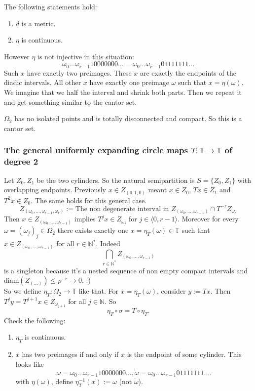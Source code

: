 \documentclass{article}
\newcommand*{\N}{\mathbb{N}}
\newcommand*{\T}{\mathbb{T}}
\newcommand*{\Ns}{\N^*}
\newcommand*{\jbr}[1]{{\langle #1 \rangle}}
\newcommand*{\diam}{\text{diam}}
\begin{document}
\begin{prop}
    The following statements hold:
    \begin{enumerate}
        \item $d$ is a metric.

        \item $\eta$ is continuous.
    \end{enumerate}
\end{prop}

However $\eta$ is not injective in this situation:
$$\omega_0\dots\omega_{r-1}10000000\dots = \omega_0\dots\omega_{r-1}01111111\dots$$
Such $x$ have exactly two preimages. These $x$ are exactly the endpoints of the diadic intervals. All other $x$ have exactly one preimage $\omega$ such that $x=\eta(\omega)$.
\newline
\newline
We imagine that we half the interval and shrink both parts. Then we repeat it and get something similar to the cantor set.

\begin{prop}
    $\Omega_2$ has no isolated points and is totally disconnected and compact. So this is a cantor set.
\end{prop}

\subsubsection{The general uniformly expanding circle maps $T:\T\to\T$ of degree 2}

Let $Z_0,Z_1$ be the two cylinders. So the natural semipartition is $S = \{Z_0,Z_1\}$ with overlapping endpoints. Previously $x\in Z_{(0,1,0)}$ meant $x \in Z_0$, $Tx\in Z_1$ and $T^2x\in Z_0$. The same holds for this general case.
$$Z_{(\omega_0,\dots,\omega_{r-1},\omega_r)} := \text{The non degenerate interval in } Z_{(\omega_0,\dots,\omega_{r-1})}\cap T^{-r}Z_{\omega_r}$$
Then $x\in Z_{(\omega_0,\dots,\omega_{r-1})}$ implies $T^jx\in Z_{\omega_j}$ for $j\in\jbr{0,r-1}$. Moreover for every $\omega=(\omega_j)_j\in\Omega_2$ there exists exactly one $x = \eta_T(\omega)\in\T$ such that $x \in Z_{(\omega_0,\dots,\omega_{r-1})}$ for all $r\in\Ns$. Indeed
$$\bigcap_{r\in\Ns} Z_{(\omega_0,\dots,\omega_{r-1})}$$
is a singleton because it's a nested sequence of non empty compact intervals and $\diam(Z_{(\dots)}) \leq \rho^{-r} \to 0$. :)\\
So we define $\eta_T:\Omega_2\to\T$ like that. For $x = \eta_T(\omega)$, consider $y := Tx$. Then $T^jy=T^{j+1}x\in Z_{\omega_{j+1}}$ for all $j\in\N$. So
$$\eta_T\circ \sigma = T\circ \eta_T.$$
Check the following:
\begin{enumerate}
    \item $\eta_T$ is continuous.

    \item $x$ has two preimages if and only if $x$ is the endpoint of some cylinder. This looks like
    $$\omega = \omega_0\dots\omega_{r-1}10000000\dots,\tilde \omega= \omega_0\dots\omega_{r-1}01111111\dots.$$
    with $\eta(\omega)$, define $\eta_T^{-1}(x) := \omega$ (not $\tilde \omega$).
\end{enumerate}
\end{document}
